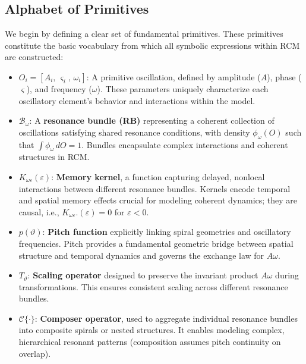 \subsection{Alphabet of Primitives}
\label{subsec3:alphabet-of-primitives}

We begin by defining a clear set of fundamental primitives. These primitives constitute the basic vocabulary from which all symbolic expressions within RCM are constructed:

\begin{itemize}
    \item $O_i = [A_i,\,\varsigma_i,\,\omega_i]$: A primitive oscillation, defined by amplitude ($A$), phase ($\varsigma$), and frequency ($\omega$). These parameters uniquely characterize each oscillatory element's behavior and interactions within the model.

    \item $\mathcal{B}_\omega$: A \textbf{resonance bundle (RB)} representing a coherent collection of oscillations satisfying shared resonance conditions, with density $\phi_\omega(O)$ such that $\int \phi_\omega\, dO = 1$. Bundles encapsulate complex interactions and coherent structures in RCM.

    \item $K_{\omega\varepsilon}(\varepsilon)$: \textbf{Memory kernel}, a function capturing delayed, nonlocal interactions between different resonance bundles. Kernels encode temporal and spatial memory effects crucial for modeling coherent dynamics; they are causal, i.e., $K_{\omega\varepsilon}.  (\varepsilon)=0$ for $\varepsilon<0$.

    \item $p(\vartheta)$: \textbf{Pitch function} explicitly linking spiral geometries and oscillatory frequencies. Pitch provides a fundamental geometric bridge between spatial structure and temporal dynamics and governs the exchange law for $A\omega$.

    \item $T_{\vartheta}$: \textbf{Scaling operator} designed to preserve the invariant product $A\omega$ during transformations. This ensures consistent scaling across different resonance bundles.

    \item $\mathcal{C}\{\cdot\}$: \textbf{Composer operator}, used to aggregate individual resonance bundles into composite spirals or nested structures. It enables modeling complex, hierarchical resonant patterns (composition assumes pitch continuity on overlap).


\end{itemize}
